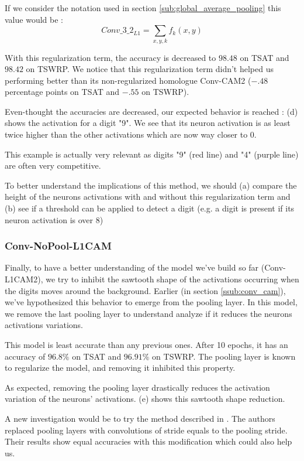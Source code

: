 				If we consider the notation used in section \ref{sub:global_average_pooling} this value would be :
				\begin{equation}
					Conv\_3\_2_{L1} = \sum_{x,y,k}f_k(x,y)
				\end{equation}

				With this regularization term, the accuracy is decreased to $98.48$ on TSAT and $98.42$ on TSWRP. We notice that this regularization term didn't helped us performing better than its non-regularized homologue Conv-CAM2 ($- .48$ percentage points on TSAT and $- .55$ on TSWRP).

				\begin{mdframed}[backgroundcolor = gray!30]
					Even-thought the accuracies are decreased, our expected behavior is reached :  (d) shows the activation for a digit "9". We see that its neuron activation is as least twice higher than the other  activations which are now way closer to 0.

					This example is actually very relevant as digits "9" (red line) and "4" (purple line) are often very competitive.

					To better understand the implications of this method, we should (a) compare the height of the neurons activations with and without this regularization term and (b) see if a threshold can be applied to detect a digit (e.g. a digit is present if its neuron activation is over 8)
				\end{mdframed}
				


			\subsubsection{Conv-NoPool-L1CAM}
			\label{ssub:conv_nopool_l1cam}
				Finally, to have a better understanding of the model we've build so far (Conv-L1CAM2), we try to inhibit the sawtooth shape of the activations occurring when the digits moves around the background. Earlier (in section \ref{ssub:conv_cam}), we've hypothesized this behavior to emerge from the pooling layer. In this model, we remove the last pooling layer to understand analyze if it reduces the neurons activations variations.

				This model is least accurate than any previous ones. After 10 epochs, it has an accuracy of $96.8\%$ on TSAT and $96.91\%$ on TSWRP. The pooling layer is known to regularize the model, and removing it inhibited this property.

				\begin{mdframed}[backgroundcolor = gray!30]
					As expected, removing the pooling layer drastically reduces the activation variation of the neurons' activations.  (e) shows this sawtooth shape reduction. 

					A new investigation would be to try the method described in \cite{springenberg2014striving}. The authors replaced  pooling layers with convolutions of stride equals to the pooling stride. Their results show equal accuracies with this modification which could also help us.
				\end{mdframed}



